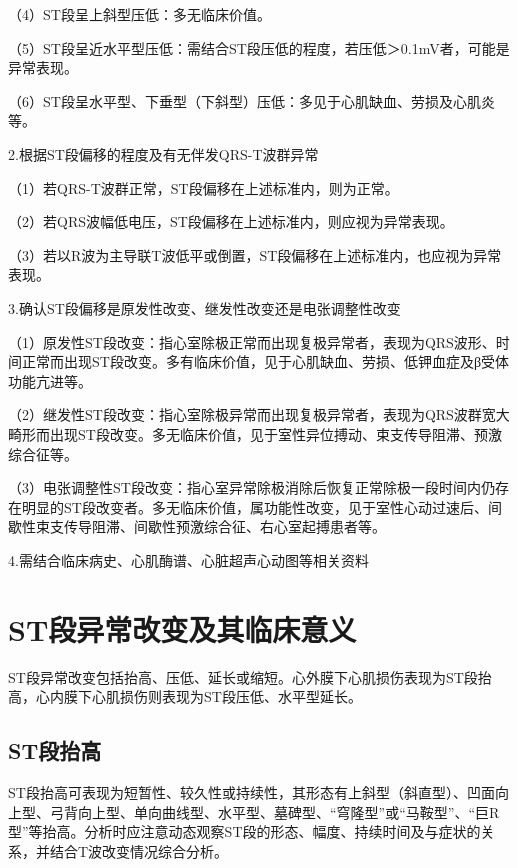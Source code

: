（4）ST段呈上斜型压低：多无临床价值。

（5）ST段呈近水平型压低：需结合ST段压低的程度，若压低＞0.1mV者，可能是异常表现。

（6）ST段呈水平型、下垂型（下斜型）压低：多见于心肌缺血、劳损及心肌炎等。

2.根据ST段偏移的程度及有无伴发QRS-T波群异常

（1）若QRS-T波群正常，ST段偏移在上述标准内，则为正常。

（2）若QRS波幅低电压，ST段偏移在上述标准内，则应视为异常表现。

（3）若以R波为主导联T波低平或倒置，ST段偏移在上述标准内，也应视为异常表现。

3.确认ST段偏移是原发性改变、继发性改变还是电张调整性改变

（1）原发性ST段改变：指心室除极正常而出现复极异常者，表现为QRS波形、时间正常而出现ST段改变。多有临床价值，见于心肌缺血、劳损、低钾血症及β受体功能亢进等。

（2）继发性ST段改变：指心室除极异常而出现复极异常者，表现为QRS波群宽大畸形而出现ST段改变。多无临床价值，见于室性异位搏动、束支传导阻滞、预激综合征等。

（3）电张调整性ST段改变：指心室异常除极消除后恢复正常除极一段时间内仍存在明显的ST段改变者。多无临床价值，属功能性改变，见于室性心动过速后、间歇性束支传导阻滞、间歇性预激综合征、右心室起搏患者等。

4.需结合临床病史、心肌酶谱、心脏超声心动图等相关资料

\protect\hypertarget{text00011.htmlux5cux23subid77}{}{}

\section{ST段异常改变及其临床意义}

ST段异常改变包括抬高、压低、延长或缩短。心外膜下心肌损伤表现为ST段抬高，心内膜下心肌损伤则表现为ST段压低、水平型延长。

\protect\hypertarget{text00011.htmlux5cux23subid78}{}{}

\subsection{ST段抬高}

ST段抬高可表现为短暂性、较久性或持续性，其形态有上斜型（斜直型）、凹面向上型、弓背向上型、单向曲线型、水平型、墓碑型、“穹隆型”或“马鞍型”、“巨R型”等抬高。分析时应注意动态观察ST段的形态、幅度、持续时间及与症状的关系，并结合T波改变情况综合分析。

